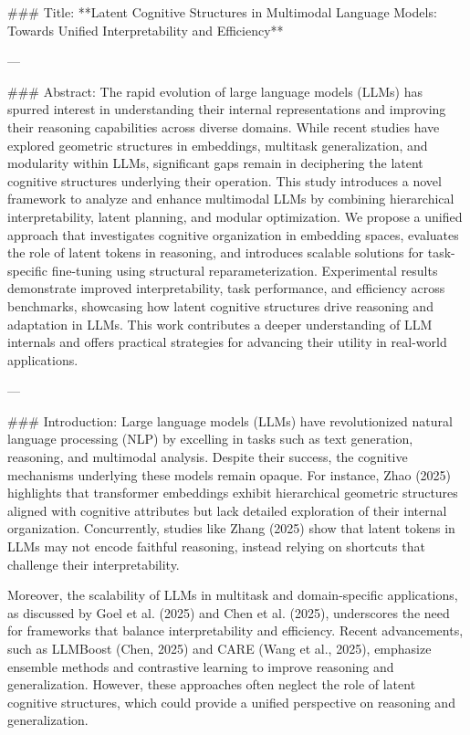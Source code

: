 ### Title:
**Latent Cognitive Structures in Multimodal Language Models: Towards Unified Interpretability and Efficiency**

---

### Abstract:
The rapid evolution of large language models (LLMs) has spurred interest in understanding their internal representations and improving their reasoning capabilities across diverse domains. While recent studies have explored geometric structures in embeddings, multitask generalization, and modularity within LLMs, significant gaps remain in deciphering the latent cognitive structures underlying their operation. This study introduces a novel framework to analyze and enhance multimodal LLMs by combining hierarchical interpretability, latent planning, and modular optimization. We propose a unified approach that investigates cognitive organization in embedding spaces, evaluates the role of latent tokens in reasoning, and introduces scalable solutions for task-specific fine-tuning using structural reparameterization. Experimental results demonstrate improved interpretability, task performance, and efficiency across benchmarks, showcasing how latent cognitive structures drive reasoning and adaptation in LLMs. This work contributes a deeper understanding of LLM internals and offers practical strategies for advancing their utility in real-world applications.

---

### Introduction:
Large language models (LLMs) have revolutionized natural language processing (NLP) by excelling in tasks such as text generation, reasoning, and multimodal analysis. Despite their success, the cognitive mechanisms underlying these models remain opaque. For instance, Zhao (2025) highlights that transformer embeddings exhibit hierarchical geometric structures aligned with cognitive attributes but lack detailed exploration of their internal organization. Concurrently, studies like Zhang (2025) show that latent tokens in LLMs may not encode faithful reasoning, instead relying on shortcuts that challenge their interpretability.

Moreover, the scalability of LLMs in multitask and domain-specific applications, as discussed by Goel et al. (2025) and Chen et al. (2025), underscores the need for frameworks that balance interpretability and efficiency. Recent advancements, such as LLMBoost (Chen, 2025) and CARE (Wang et al., 2025), emphasize ensemble methods and contrastive learning to improve reasoning and generalization. However, these approaches often neglect the role of latent cognitive structures, which could provide a unified perspective on reasoning and generalization.

